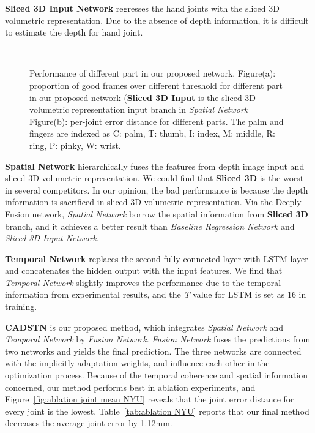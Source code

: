 \documentclass[journal,comsoc]{IEEEtran}
\let\MYoriglatexcaption\caption
\renewcommand{\caption}[2][\relax]{\MYoriglatexcaption[#2]{#2}}
\begin{document}
\textbf{Sliced 3D Input Network} regresses the hand joints with the sliced 3D volumetric representation. Due to the absence of
depth information, it is difficult to estimate the depth for hand joint.

\begin{figure}[htbp]\footnotesize
\centering
    \\
    \caption{Performance of different part in our proposed network. Figure(a): proportion of good frames over different threshold for different part in our  proposed network (\textbf{Sliced 3D Input} is the sliced 3D volumetric representation input branch in \emph{Spatial Network} Figure(b): per-joint error distance for different parts. The palm and fingers are indexed as C: palm, T: thumb, I: index, M: middle, R: ring, P: pinky, W: wrist.}
    \label{fig:result ablation}
\end{figure}

\textbf{Spatial Network} hierarchically fuses the features from depth image input and
sliced 3D volumetric representation. We could find that \textbf{Sliced 3D} is the worst in several competitors. In our
opinion, the bad performance is because the depth information is sacrificed in sliced 3D volumetric representation.
Via the Deeply-Fusion network, \emph{Spatial Network} borrow the spatial information from \textbf{Sliced 3D} branch, and
it achieves a better result than \emph{Baseline Regression Network} and \emph{Sliced 3D Input Network}.

\textbf{Temporal Network} replaces the second fully connected layer with LSTM layer and
concatenates the hidden output with the input features. We find that \emph{Temporal Network} slightly improves the performance
due to the temporal information from experimental results, and the \emph{T} value for LSTM is set as 16 in training.

\textbf{CADSTN} is our proposed method, which integrates \emph{Spatial Network} and \emph{Temporal Network}
by \emph{Fusion Network}. \emph{Fusion Network} fuses the predictions from two networks and yields the final prediction.
The three networks are connected with the implicitly adaptation weights, and influence each other in the
optimization process.
Because of the temporal coherence and spatial information concerned, our method performs best in ablation experiments,
and Figure~\ref{fig:ablation joint mean NYU} reveals that the joint error distance for every joint is the lowest. Table~\ref{tab:ablation NYU}
reports that our final method decreases the average joint error by 1.12mm.
\end{document}
